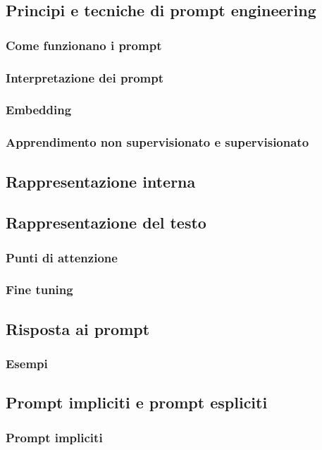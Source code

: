     \subsection{Principi e tecniche di prompt engineering}
        \subsubsection{Come funzionano i prompt}
        \subsubsection{Interpretazione dei prompt}
        \subsubsection{Embedding}
        \subsubsection{Apprendimento non supervisionato e supervisionato}
    \subsection{Rappresentazione interna}
    \subsection{Rappresentazione del testo}
        \subsubsection{Punti di attenzione}
        \subsubsection{Fine tuning}
    \subsection{Risposta ai prompt}
        \subsubsection{Esempi}
    \subsection{Prompt impliciti e prompt espliciti}
        \subsubsection{Prompt impliciti}
